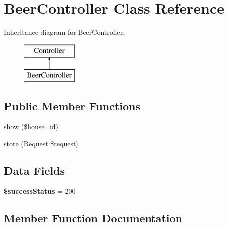 \hypertarget{class_app_1_1_http_1_1_controllers_1_1_a_p_i_1_1_beer_controller}{}\section{Beer\+Controller Class Reference}
\label{class_app_1_1_http_1_1_controllers_1_1_a_p_i_1_1_beer_controller}
Inheritance diagram for Beer\+Controller\+:\begin{figure}[H]
\begin{center}
\leavevmode
\includegraphics[height=2.000000cm]{class_app_1_1_http_1_1_controllers_1_1_a_p_i_1_1_beer_controller}
\end{center}
\end{figure}
\subsection*{Public Member Functions}
\begin{DoxyCompactItemize}
\item 
\mbox{\hyperlink{class_app_1_1_http_1_1_controllers_1_1_a_p_i_1_1_beer_controller_ac20790a51d9718bb438c19b75e2eee04}{show}} (\$house\+\_\+id)
\item 
\mbox{\hyperlink{class_app_1_1_http_1_1_controllers_1_1_a_p_i_1_1_beer_controller_a9ef485163104597c12185b53cdacf638}{store}} (Request \$request)
\end{DoxyCompactItemize}
\subsection*{Data Fields}
\begin{DoxyCompactItemize}
\item 
\mbox{\label{class_app_1_1_http_1_1_controllers_1_1_a_p_i_1_1_beer_controller_a4fde01aada3b602338d7002a598a8763}} 
{\bfseries \$success\+Status} = 200
\end{DoxyCompactItemize}


\subsection{Member Function Documentation}
\mbox{\label{class_app_1_1_http_1_1_controllers_1_1_a_p_i_1_1_beer_controller_ac20790a51d9718bb438c19b75e2eee04}} 
